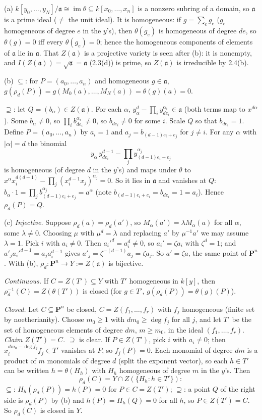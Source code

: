 \documentclass[11pt]{article}
\begin{document}
(a) $k[y_0,\dots,y_N]/\mathfrak a\cong\operatorname{im}\theta\subseteq k[x_0,\dots,x_n]$ is a nonzero subring of a domain, so $\mathfrak a$ is a prime ideal ($\ne$ the unit ideal). It is homogeneous: if $g=\sum_eg_e$ ($g_e$ homogeneous of degree $e$ in the $y$'s), then $\theta(g_e)$ is homogeneous of degree $de$, so $\theta(g)=0$ iff every $\theta(g_e)=0$; hence the homogeneous components of elements of $\mathfrak a$ lie in $\mathfrak a$. That $Z(\mathfrak a)$ is a projective variety is seen after (b): it is nonempty, and $I(Z(\mathfrak a))=\sqrt{\mathfrak a}=\mathfrak a$ (2.3(d)) is prime, so $Z(\mathfrak a)$ is irreducible by 2.4(b).

(b) $\subseteq$: for $P=(a_0,\dots,a_n)$ and homogeneous $g\in\mathfrak a$, $g(\rho_d(P))=g(M_0(a),\dots,M_N(a))=\theta(g)(a)=0$.

$\supseteq$: let $Q=(b_\alpha)\in Z(\mathfrak a)$. For each $\alpha$, $y_\alpha^d-\prod_iy_{de_i}^{\alpha_i}\in\mathfrak a$ (both terms map to $x^{d\alpha}$). Some $b_\alpha\ne0$, so $\prod_ib_{de_i}^{\alpha_i}\ne0$, so $b_{de_i}\ne0$ for some $i$. Scale $Q$ so that $b_{de_i}=1$. Define $P=(a_0,\dots,a_n)$ by $a_i=1$ and $a_j=b_{(d-1)e_i+e_j}$ for $j\ne i$. For any $\alpha$ with $|\alpha|=d$ the binomial
\[
y_\alpha\,y_{de_i}^{d-1}-\prod_jy_{(d-1)e_i+e_j}^{\alpha_j}
\]
is homogeneous (of degree $d$ in the $y$'s) and maps under $\theta$ to $x^\alpha x_i^{d(d-1)}-\prod_j(x_i^{d-1}x_j)^{\alpha_j}=0$. So it lies in $\mathfrak a$ and vanishes at $Q$: $b_\alpha\cdot1=\prod_jb_{(d-1)e_i+e_j}^{\alpha_j}=a^\alpha$ (note $b_{(d-1)e_i+e_i}=b_{de_i}=1=a_i$). Hence $\rho_d(P)=Q$.

(c) \emph{Injective.} Suppose $\rho_d(a)=\rho_d(a')$, so $M_\alpha(a')=\lambda M_\alpha(a)$ for all $\alpha$, some $\lambda\neq0$. Choosing $\mu$ with $\mu^d=\lambda$ and replacing $a'$ by $\mu^{-1}a'$ we may assume $\lambda=1$. Pick $i$ with $a_i\ne0$. Then $a_i'^d=a_i^d\ne0$, so $a_i'=\zeta a_i$ with $\zeta^d=1$; and $a'_ja_i'^{d-1}=a_ja_i^{d-1}$ gives $a'_j=\zeta^{-(d-1)}a_j=\zeta a_j$. So $a'=\zeta a$, the same point of $\mathbf P^n$. With (b), $\rho_d:\mathbf P^n\to Y:=Z(\mathfrak a)$ is bijective.

\emph{Continuous.} If $C=Z(T')\subseteq Y$ with $T'$ homogeneous in $k[y]$, then $\rho_d^{-1}(C)=Z(\theta(T'))$ is closed (for $g\in T'$, $g(\rho_d(P))=\theta(g)(P)$).

\emph{Closed.} Let $C\subseteq\mathbf P^n$ be closed, $C=Z(f_1,\dots,f_r)$ with $f_j$ homogeneous (finite set by noetherianity). Choose $m_0\ge1$ with $dm_0\ge\deg f_j$ for all $j$, and let $T'$ be the set of homogeneous elements of degree $dm$, $m\ge m_0$, in the ideal $(f_1,\dots,f_r)$. \emph{Claim $Z(T')=C$.} $\supseteq$ is clear. If $P\in Z(T')$, pick $i$ with $a_i\ne0$; then $x_i^{dm_0-\deg f_j}f_j\in T'$ vanishes at $P$, so $f_j(P)=0$. Each monomial of degree $dm$ is a product of $m$ monomials of degree $d$ (split the exponent vector), so each $h\in T'$ can be written $h=\theta(H_h)$ with $H_h$ homogeneous of degree $m$ in the $y$'s. Then
\[
\rho_d(C)=Y\cap Z(\{H_h:h\in T'\}):
\]
$\subseteq$: $H_h(\rho_d(P))=h(P)=0$ for $P\in C=Z(T')$; $\supseteq$: a point $Q$ of the right side is $\rho_d(P)$ by (b) and $h(P)=H_h(Q)=0$ for all $h$, so $P\in Z(T')=C$. So $\rho_d(C)$ is closed in $Y$.
\end{document}
